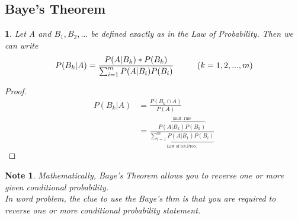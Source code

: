 \documentclass[11pt]{article}
\newtheorem{theorem}{\framebox{Thm}}[section]
\newtheorem*{note}{Note}
\newcommand\tab[1][1cm]{\hspace*{#1}}
\begin{document}
            \subsection{Baye's Theorem}
                \begin{theorem}
                    Let A and $B_1, B_2,...$ be defined exactly as in the \textit{Law of Probability}. 
                    Then we can write  $$P(B_k | A) = \frac{P(A|B_k) *P(B_k)}{\sum_{i=1}^m P(A|B_i) P(B_i)} \tab (k=1,2,...,m)$$
                \end{theorem}
                \begin{proof}
                    \begin{align*}
                        P(B_k|A)    &= \frac{P(B_k \cap A)}{P(A)} \\
                                    &= \frac{\overbrace{P(A|B_k)P(B_k)}^\text{mult. rule}}{\underbrace{\sum_{i=1}^m P(A|B_1)P(B_i)}_{\text{Law of tot.Prob.}}}
                    \end{align*}
                \end{proof}
                \begin{note}
                    Mathematically, Baye's Theorem allows you to reverse one or more given conditional probability. \\
                    In word problem, the clue to use the Baye's thm is that you are required to reverse one or more conditional probability statement. 
                \end{note}
                \newpage
\end{document}
